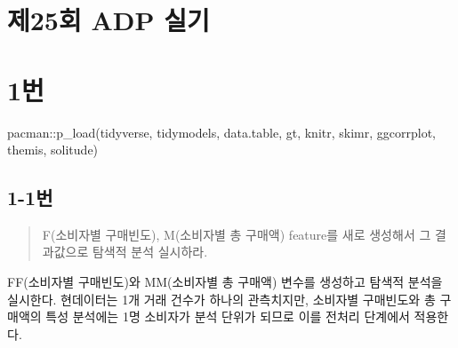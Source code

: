 \documentclass[
  letterpaper,
  DIV=11,
  numbers=noendperiod]{scrreprt}
\newenvironment{Shaded}{\begin{snugshade}}{\end{snugshade}}
\newcommand{\FunctionTok}[1]{\textcolor[rgb]{0.28,0.35,0.67}{#1}}
\newcommand{\NormalTok}[1]{\textcolor[rgb]{0.00,0.23,0.31}{#1}}
\newcommand{\SpecialCharTok}[1]{\textcolor[rgb]{0.37,0.37,0.37}{#1}}
\begin{document}
\hypertarget{uxc81c25uxd68c-adp-uxc2e4uxae30}{%
\chapter*{제25회 ADP 실기}\label{uxc81c25uxd68c-adp-uxc2e4uxae30}}


\hypertarget{uxbc88-38}{%
\chapter*{1번}\label{uxbc88-38}}


\begin{Shaded}
\begin{Highlighting}[]
\NormalTok{pacman}\SpecialCharTok{::}\FunctionTok{p\_load}\NormalTok{(tidyverse, tidymodels, data.table, gt, knitr,}
\NormalTok{               skimr, ggcorrplot, themis, solitude)}
\end{Highlighting}
\end{Shaded}

\hypertarget{uxbc88-39}{%
\section*{1-1번}\label{uxbc88-39}}


\begin{quote}
F(소비자별 구매빈도), M(소비자별 총 구매액) feature를 새로 생성해서 그
결과값으로 탐색적 분석 실시하라.
\end{quote}

FF(소비자별 구매빈도)와 MM(소비자별 총 구매액) 변수를 생성하고 탐색적
분석을 실시한다. 현데이터는 1개 거래 건수가 하나의 관측치지만, 소비자별
구매빈도와 총 구매액의 특성 분석에는 1명 소비자가 분석 단위가 되므로
이를 전처리 단계에서 적용한다.
\end{document}
